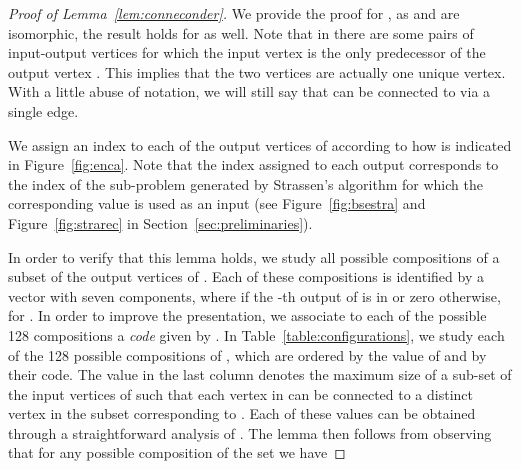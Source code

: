 \documentclass[a4paper,UKenglish]{lipics-v2016}
\begin{document}
\begin{proof}[Proof of Lemma~\ref{lem:conneconder}]
We provide the proof for , as  and  are isomorphic,  the result holds for  as well. 
	Note that in  there are some pairs of input-output vertices  for which the input vertex  is the only predecessor of the output vertex . This implies that the two vertices are actually one unique vertex. With a little abuse of notation, we will still say that   can be connected to  via a single edge.
		
	We assign an index to each of the output vertices of  according to how is indicated in Figure~\ref{fig:enca}.  
Note that the index assigned to each output corresponds to the index of the sub-problem generated by Strassen's algorithm for which the corresponding value is used as an input (see Figure~\ref{fig:bsestra} and Figure~\ref{fig:strarec} in Section~\ref{sec:preliminaries}). 

In order to verify that this lemma holds, we study all possible compositions of a subset  of the output vertices of .  Each of these compositions is identified by a vector  with seven components, where  if the -th output of  is in  or zero otherwise, for . In order to improve the presentation, we associate to each of the possible 128 compositions a \emph{code} given by . In Table~\ref{table:configurations}, we study each of the 128 possible compositions of , which are ordered by the value of  and by their code. The value in the last column  denotes the maximum size of a sub-set  of the input vertices of  such that each vertex in  can be connected to a distinct vertex in the subset  corresponding to . Each of these values can be obtained through a straightforward analysis of .
The lemma then follows from observing that for any possible composition of the set  we have

\end{proof}
\end{document}
